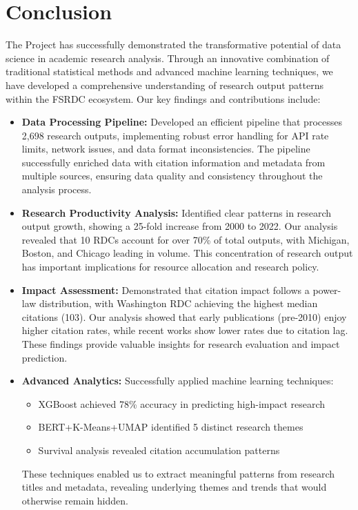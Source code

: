\documentclass[12pt]{article}
\begin{document}
\section{Conclusion}
The Project has successfully demonstrated the transformative potential of data science in academic research analysis. Through an innovative combination of traditional statistical methods and advanced machine learning techniques, we have developed a comprehensive understanding of research output patterns within the FSRDC ecosystem. Our key findings and contributions include:

\begin{itemize}
    \item \textbf{Data Processing Pipeline:} Developed an efficient pipeline that processes 2,698 research outputs, implementing robust error handling for API rate limits, network issues, and data format inconsistencies. The pipeline successfully enriched data with citation information and metadata from multiple sources, ensuring data quality and consistency throughout the analysis process.
    
    \item \textbf{Research Productivity Analysis:} Identified clear patterns in research output growth, showing a 25-fold increase from 2000 to 2022. Our analysis revealed that 10 RDCs account for over 70\% of total outputs, with Michigan, Boston, and Chicago leading in volume. This concentration of research output has important implications for resource allocation and research policy.
    
    \item \textbf{Impact Assessment:} Demonstrated that citation impact follows a power-law distribution, with Washington RDC achieving the highest median citations (103). Our analysis showed that early publications (pre-2010) enjoy higher citation rates, while recent works show lower rates due to citation lag. These findings provide valuable insights for research evaluation and impact prediction.
    
    \item \textbf{Advanced Analytics:} Successfully applied machine learning techniques:
    \begin{itemize}
        \item XGBoost achieved 78\% accuracy in predicting high-impact research
        \item BERT+K-Means+UMAP identified 5 distinct research themes
        \item Survival analysis revealed citation accumulation patterns
    \end{itemize}
    These techniques enabled us to extract meaningful patterns from research titles and metadata, revealing underlying themes and trends that would otherwise remain hidden.
    

\end{itemize}
\end{document}
